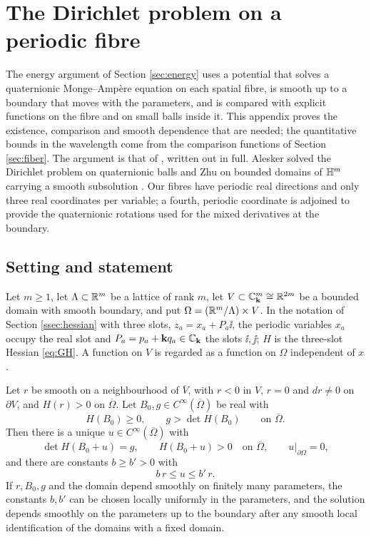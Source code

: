 \section{The Dirichlet problem on a periodic fibre}\label{app:dirichlet}

The energy argument of Section \ref{sec:energy} uses a potential that solves a quaternionic
Monge--Amp\`ere equation on each spatial fibre, is smooth up to a boundary that moves with the
parameters, and is compared with explicit functions on the fibre and on small balls inside it. This
appendix proves the existence, comparison and smooth dependence that are needed; the quantitative
bounds in the wavelength come from the comparison functions of Section \ref{sec:fiber}. The argument
is that of \cite[Appendix A]{OAI26}, written out in full. Alesker solved the Dirichlet problem on
quaternionic balls \cite[Theorem 1.4]{Ale03b} and Zhu on bounded domains of $\mathbb{H}^m$ carrying a smooth
subsolution \cite[Theorem 1.1]{Zhu16}. Our fibres have periodic real directions and only three real
coordinates per variable; a fourth, periodic coordinate is adjoined to provide the quaternionic
rotations used for the mixed derivatives at the boundary.

\subsection{Setting and statement}
Let $m\ge1$, let $\Lambda\subset\mathbb{R}^m$ be a lattice of rank $m$, let $V\subset\mathbb{C}_{\mathbf k}^m\cong\mathbb{R}^{2m}$ be a bounded
domain with smooth boundary, and put $\Omega=(\mathbb{R}^m/\Lambda)\times V$. In the notation of Section
\ref{ssec:hessian} with three slots, $z_a=x_a+P_a\ii$, the periodic variables $x_a$ occupy the real
slot and $P_a=p_a+\mathbf k q_a\in\mathbb{C}_{\mathbf k}$ the slots $\ii,\jj$; $H$ is the three-slot Hessian \eqref{eq:GH}. A
function on $V$ is regarded as a function on $\Omega$ independent of $x$.

\begin{theorem}\label{thm:dirichlet}
Let $r$ be smooth on a neighbourhood of $\overline V$, with $r<0$ in $V$, $r=0$ and $dr\ne0$ on
$\partial V$, and $H(r)>0$ on $\overline\Omega$. Let $B_0,g\in C^\infty(\overline\Omega)$ be real with
\[
H(B_0)\ge0,\qquad g>\det H(B_0)\qquad\text{on }\overline\Omega .
\]
Then there is a unique $u\in C^\infty(\overline\Omega)$ with
\begin{equation}\label{eq:dirichletA}
\det H(B_0+u)=g,\qquad H(B_0+u)>0\quad\text{on }\overline\Omega,\qquad u|_{\partial\Omega}=0,
\end{equation}
and there are constants $b\ge b'>0$ with
\begin{equation}\label{eq:barrier}
b\,r\le u\le b'\,r .
\end{equation}
If $r,B_0,g$ and the domain depend smoothly on finitely many parameters, the constants $b,b'$ can be
chosen locally uniformly in the parameters, and the solution depends smoothly on the parameters up to
the boundary after any smooth local identification of the domains with a fixed domain.
\end{theorem}

